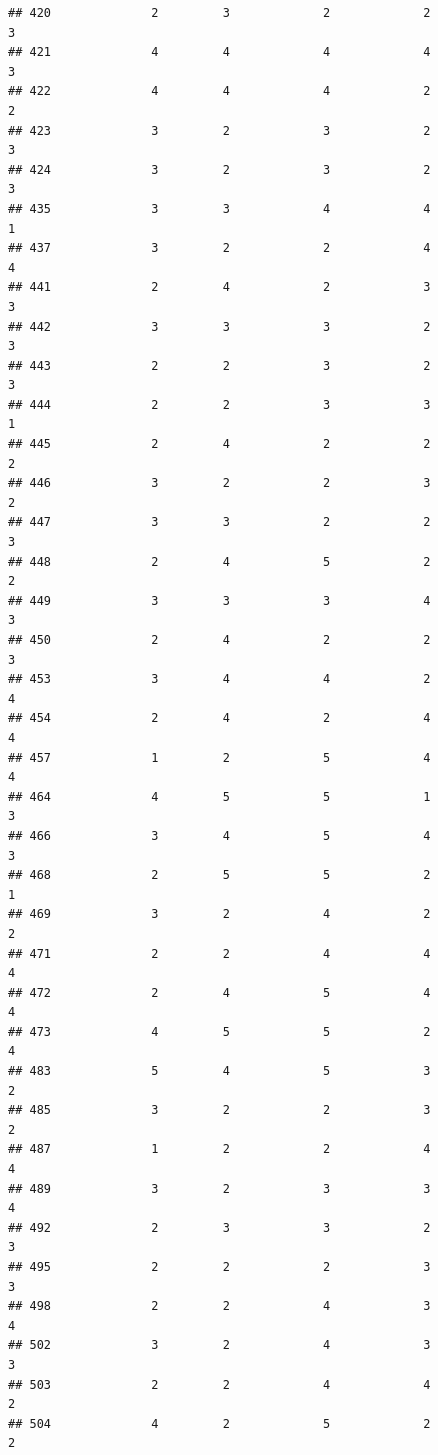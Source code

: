 \documentclass[
]{article}
\begin{document}
\begin{verbatim}
## 420              2         3             2             2           3
## 421              4         4             4             4           3
## 422              4         4             4             2           2
## 423              3         2             3             2           3
## 424              3         2             3             2           3
## 435              3         3             4             4           1
## 437              3         2             2             4           4
## 441              2         4             2             3           3
## 442              3         3             3             2           3
## 443              2         2             3             2           3
## 444              2         2             3             3           1
## 445              2         4             2             2           2
## 446              3         2             2             3           2
## 447              3         3             2             2           3
## 448              2         4             5             2           2
## 449              3         3             3             4           3
## 450              2         4             2             2           3
## 453              3         4             4             2           4
## 454              2         4             2             4           4
## 457              1         2             5             4           4
## 464              4         5             5             1           3
## 466              3         4             5             4           3
## 468              2         5             5             2           1
## 469              3         2             4             2           2
## 471              2         2             4             4           4
## 472              2         4             5             4           4
## 473              4         5             5             2           4
## 483              5         4             5             3           2
## 485              3         2             2             3           2
## 487              1         2             2             4           4
## 489              3         2             3             3           4
## 492              2         3             3             2           3
## 495              2         2             2             3           3
## 498              2         2             4             3           4
## 502              3         2             4             3           3
## 503              2         2             4             4           2
## 504              4         2             5             2           2

\end{verbatim}
\end{document}
